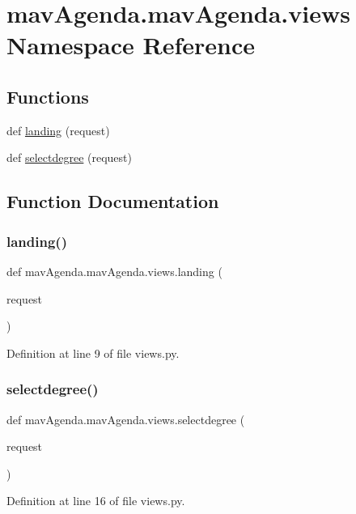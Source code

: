 \hypertarget{namespacemavAgenda_1_1mavAgenda_1_1views}{}\section{mav\+Agenda.\+mav\+Agenda.\+views Namespace Reference}
\label{namespacemavAgenda_1_1mavAgenda_1_1views}
\subsection*{Functions}
\begin{DoxyCompactItemize}
\item 
def \mbox{\hyperlink{namespacemavAgenda_1_1mavAgenda_1_1views_ad9cb5be44183c0b001ee6e1b8fef5fbc}{landing}} (request)
\item 
def \mbox{\hyperlink{namespacemavAgenda_1_1mavAgenda_1_1views_adf57950b610bf6e0b3720d2b62973c74}{selectdegree}} (request)
\end{DoxyCompactItemize}


\subsection{Function Documentation}
\mbox{\label{namespacemavAgenda_1_1mavAgenda_1_1views_ad9cb5be44183c0b001ee6e1b8fef5fbc}} 
\subsubsection{\texorpdfstring{landing()}{landing()}}
{\footnotesize\ttfamily def mav\+Agenda.\+mav\+Agenda.\+views.\+landing (\begin{DoxyParamCaption}\item[{}]{request }\end{DoxyParamCaption})}



Definition at line 9 of file views.\+py.

\mbox{\label{namespacemavAgenda_1_1mavAgenda_1_1views_adf57950b610bf6e0b3720d2b62973c74}} 
\subsubsection{\texorpdfstring{selectdegree()}{selectdegree()}}
{\footnotesize\ttfamily def mav\+Agenda.\+mav\+Agenda.\+views.\+selectdegree (\begin{DoxyParamCaption}\item[{}]{request }\end{DoxyParamCaption})}



Definition at line 16 of file views.\+py.

